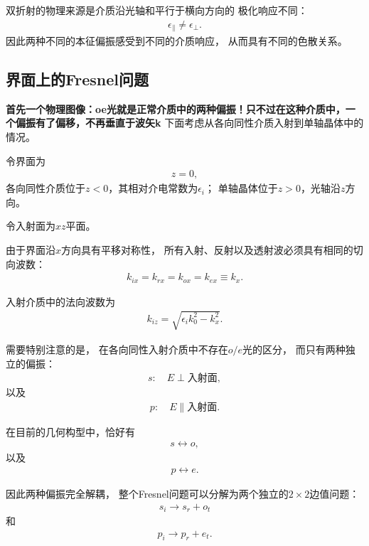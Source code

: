 \documentclass{article}
\begin{document}
双折射的物理来源是介质沿光轴和平行于横向方向的
极化响应不同：
\begin{align}
    \epsilon_\parallel\neq\epsilon_\perp.
\end{align}
因此两种不同的本征偏振感受到不同的介质响应，
从而具有不同的色散关系。

\subsection{界面上的Fresnel问题}
\textbf{首先一个物理图像：oe光就是正常介质中的两种偏振！只不过在这种介质中，一个偏振有了偏移，不再垂直于波矢k}
下面考虑从各向同性介质入射到单轴晶体中的情况。

令界面为
\begin{align}
    z=0,
\end{align}
各向同性介质位于$z<0$，其相对介电常数为$\epsilon_i$；
单轴晶体位于$z>0$，光轴沿$z$方向。

令入射面为$xz$平面。

由于界面沿$x$方向具有平移对称性，
所有入射、反射以及透射波必须具有相同的切向波数：
\begin{align}
    \boxed{
    k_{ix}=k_{rx}=k_{ox}=k_{ex}\equiv k_x
    }.
\end{align}

入射介质中的法向波数为
\begin{align}
    k_{iz}
    =
    \sqrt{
    \epsilon_i k_0^2-k_x^2
    }.
\end{align}

需要特别注意的是，
在各向同性入射介质中不存在$o/e$光的区分，
而只有两种独立的偏振：
\begin{align}
    s:\quad E\perp\text{入射面},
\end{align}
以及
\begin{align}
    p:\quad E\parallel\text{入射面}.
\end{align}

在目前的几何构型中，恰好有
\begin{align}
    \boxed{
    s\longleftrightarrow o
    },
\end{align}
以及
\begin{align}
    \boxed{
    p\longleftrightarrow e
    }.
\end{align}

因此两种偏振完全解耦，
整个Fresnel问题可以分解为两个独立的$2\times2$边值问题：
\begin{align}
    \boxed{
    s_i\rightarrow s_r+o_t
    }
\end{align}
和
\begin{align}
    \boxed{
    p_i\rightarrow p_r+e_t
    }.
\end{align}
\end{document}
